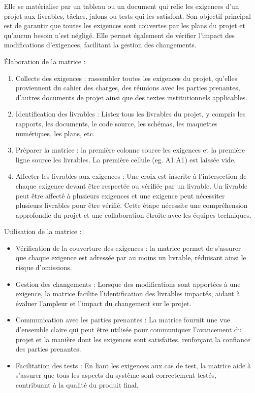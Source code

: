 \documentclass[a4paper,12pt]{article}
\begin{document}
Elle se matérialise par un tableau ou un document qui relie les exigences d'un projet aux livrables, tâches, jalons ou tests qui les satisfont. Son objectif principal est de garantir que toutes les exigences sont couvertes par les plans du projet et qu'aucun besoin n'est négligé. Elle permet également de vérifier l'impact des modifications d'exigences, facilitant la gestion des changements.

Élaboration de la matrice :
\begin{enumerate}
\item Collecte des exigences : rassembler toutes les exigences du projet, qu'elles proviennent du cahier des charges, des réunions avec les parties prenantes, d'autres documents de projet ainsi que des textes institutionnels applicables.
\item Identification des livrables : Listez tous les livrables du projet, y compris les rapports, les documents, le code source, les schémas, les maquettes numériques, les plans, etc.
\item Préparer la matrice : la première colonne source les exigences et la première ligne source les livrables. La première cellule (eg. A1:A1) est laissée vide.
\item Affecter les livrables aux exigences : Une croix est inscrite à l'intersection de chaque exigence devant être respectée ou vérifiée par un livrable. Un livrable peut être affecté à plusieurs exigences et une exigence peut nécessiter plusieurs livrables pour être vérifié. Cette étape nécessite une compréhension approfondie du projet et une collaboration étroite avec les équipes techniques.
\end{enumerate}

Utilisation de la matrice :
\begin{itemize}
\item Vérification de la couverture des exigences : la matrice permet de s'assurer que chaque exigence est adressée par au moins un livrable, réduisant ainsi le risque d'omissions.
\item Gestion des changements : Lorsque des modifications sont apportées à une exigence, la matrice facilite l'identification des livrables impactés, aidant à évaluer l'ampleur et l'impact du changement sur le projet.
\item Communication avec les parties prenantes : La matrice fournit une vue d'ensemble claire qui peut être utilisée pour communiquer l'avancement du projet et la manière dont les exigences sont satisfaites, renforçant la confiance des parties prenantes.
\item Facilitation des tests : En liant les exigences aux cas de test, la matrice aide à s'assurer que tous les aspects du système sont correctement testés, contribuant à la qualité du produit final.
\end{itemize}
\end{document}

